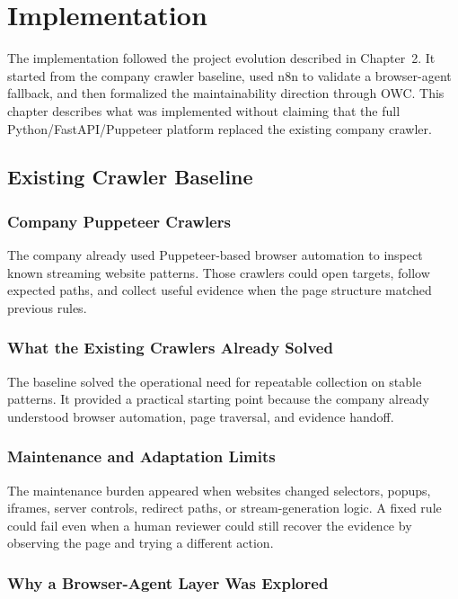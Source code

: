 \chapter{Implementation}
\label{chap:implementation}

The implementation followed the project evolution described in Chapter~2. It
started from the company crawler baseline, used n8n to validate a browser-agent
fallback, and then formalized the maintainability direction through OWC. This
chapter describes what was implemented without claiming that the full
Python/FastAPI/Puppeteer platform replaced the existing company crawler.

\section{Existing Crawler Baseline}

\subsection{Company Puppeteer Crawlers}

The company already used Puppeteer-based browser automation to inspect known
streaming website patterns. Those crawlers could open targets, follow expected
paths, and collect useful evidence when the page structure matched previous
rules.

\subsection{What the Existing Crawlers Already Solved}

The baseline solved the operational need for repeatable collection on stable
patterns. It provided a practical starting point because the company already
understood browser automation, page traversal, and evidence handoff.

\subsection{Maintenance and Adaptation Limits}

The maintenance burden appeared when websites changed selectors, popups,
iframes, server controls, redirect paths, or stream-generation logic. A fixed
rule could fail even when a human reviewer could still recover the evidence by
observing the page and trying a different action.

\subsection{Why a Browser-Agent Layer Was Explored}

